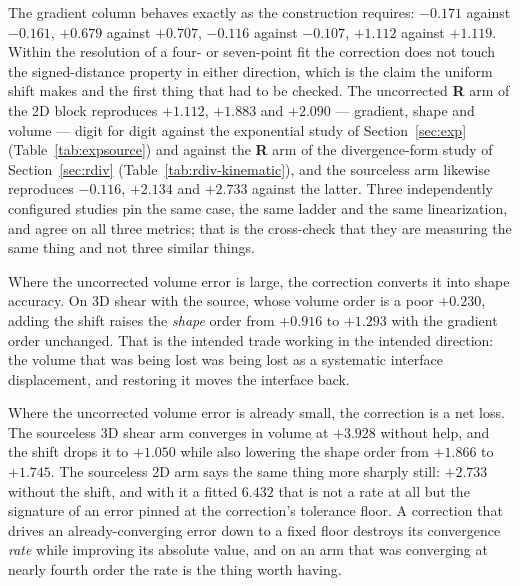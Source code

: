 \documentclass[preprint,3p,11pt]{elsarticle}
\begin{document}
The gradient column behaves exactly as the construction requires: $-0.171$ against
$-0.161$, $+0.679$ against $+0.707$, $-0.116$ against $-0.107$, $+1.112$ against
$+1.119$. Within the resolution of a four- or seven-point fit the correction does
not touch the signed-distance property in either direction, which is the claim
the uniform shift makes and the first thing that had to be checked. The
uncorrected \textbf{R} arm of the 2D block reproduces $+1.112$, $+1.883$ and
$+2.090$ --- gradient, shape and volume --- digit for digit against the
exponential study of Section~\ref{sec:exp} (Table~\ref{tab:expsource}) and against
the \textbf{R} arm of the divergence-form study of Section~\ref{sec:rdiv}
(Table~\ref{tab:rdiv-kinematic}), and the sourceless arm likewise reproduces
$-0.116$, $+2.134$ and $+2.733$ against the latter. Three independently configured
studies pin the same case, the same ladder and the same linearization, and agree
on all three metrics; that is the cross-check that they are measuring the same
thing and not three similar things.

Where the uncorrected volume error is large, the correction converts it into
shape accuracy. On 3D shear with the source, whose volume order is a poor $+0.230$,
adding the shift raises the \emph{shape} order from $+0.916$ to $+1.293$ with the
gradient order unchanged. That is the intended trade working in the intended
direction: the volume that was being lost was being lost as a systematic
interface displacement, and restoring it moves the interface back.

Where the uncorrected volume error is already small, the correction is a net
loss. The sourceless 3D shear arm converges in volume at $+3.928$ without help,
and the shift drops it to $+1.050$ while also lowering the shape order from
$+1.866$ to $+1.745$. The sourceless 2D arm says the same thing more sharply
still: $+2.733$ without the shift, and with it a fitted $6.432$ that is not a rate
at all but the signature of an error pinned at the correction's tolerance floor.
A correction that drives an already-converging error down to a fixed floor
destroys its convergence \emph{rate} while improving its absolute value, and on an
arm that was converging at nearly fourth order the rate is the thing worth having.
\end{document}
